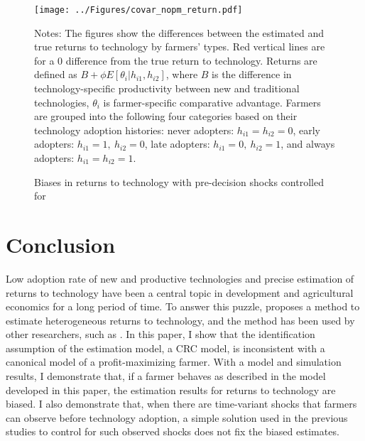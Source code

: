 \documentclass[11pt,letterpaper]{article}
\begin{document}
\begin{figure}[H]
  \centering
  \caption{Biases in returns to technology with pre-decision shocks controlled for}
  \texttt{[image: ../Figures/covar\_nopm\_return.pdf]}
  \label{fig:covar_nopm_return}
  \footnotesize
  \begin{tablenotes}
    \item Notes:
      The figures show the differences between the estimated and true returns to technology by farmers' types.
      Red vertical lines are for a 0 difference from the true return to technology.
      Returns are defined as $B + \phi E[\theta_i | h_{i1}, h_{i2}]$, where $B$ is the difference in technology-specific productivity between new and traditional technologies, $\theta_i$ is farmer-specific comparative advantage.
      Farmers are grouped into the following four categories based on their technology adoption histories:
      never adopters: $h_{i1} = h_{i2} = 0$, 
      early adopters: $h_{i1} = 1, \ h_{i2} = 0$, 
      late adopters: $h_{i1} = 0, \ h_{i2} = 1$, and
      always adopters: $h_{i1} = h_{i2} = 1$.
  \end{tablenotes}
\end{figure}

\section{Conclusion}\label{sec:conclusion}

Low adoption rate of new and productive technologies and precise estimation of returns to technology have been a central topic in development and agricultural economics for a long period of time.
To answer this puzzle, \citet{Suri11} proposes a method to estimate heterogeneous returns to technology, and the method has been used by other researchers, such as \citet{Michler2019}.
In this paper, I show that the identification assumption of the estimation model, a CRC model, is inconsistent with a canonical model of a profit-maximizing farmer.
With a model and simulation results, I demonstrate that, if a farmer behaves as described in the model developed in this paper, the estimation results for returns to technology are biased.
I also demonstrate that, when there are time-variant shocks that farmers can observe before technology adoption, a simple solution used in the previous studies to control for such observed shocks does not fix the biased estimates.
\end{document}
